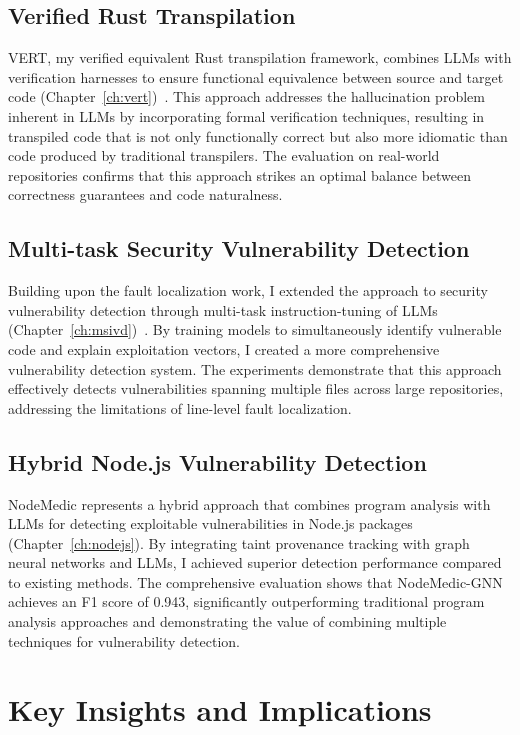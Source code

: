 \subsection{Verified Rust Transpilation}

VERT, my verified equivalent Rust transpilation framework, combines LLMs with verification harnesses to ensure functional equivalence between source and target code (Chapter~\ref{ch:vert})~\cite{vert}. This approach addresses the hallucination problem inherent in LLMs by incorporating formal verification techniques, resulting in transpiled code that is not only functionally correct but also more idiomatic than code produced by traditional transpilers. The evaluation on real-world repositories confirms that this approach strikes an optimal balance between correctness guarantees and code naturalness.

\subsection{Multi-task Security Vulnerability Detection}

Building upon the fault localization work, I extended the approach to security vulnerability detection through multi-task instruction-tuning of LLMs (Chapter~\ref{ch:msivd})~\cite{yang2024security}. By training models to simultaneously identify vulnerable code and explain exploitation vectors, I created a more comprehensive vulnerability detection system. The experiments demonstrate that this approach effectively detects vulnerabilities spanning multiple files across large repositories, addressing the limitations of line-level fault localization.

\subsection{Hybrid Node.js Vulnerability Detection}

NodeMedic represents a hybrid approach that combines program analysis with LLMs for detecting exploitable vulnerabilities in Node.js packages (Chapter~\ref{ch:nodejs}). By integrating taint provenance tracking with graph neural networks and LLMs, I achieved superior detection performance compared to existing methods. The comprehensive evaluation shows that NodeMedic-GNN achieves an F1 score of 0.943, significantly outperforming traditional program analysis approaches and demonstrating the value of combining multiple techniques for vulnerability detection.

\section{Key Insights and Implications}

